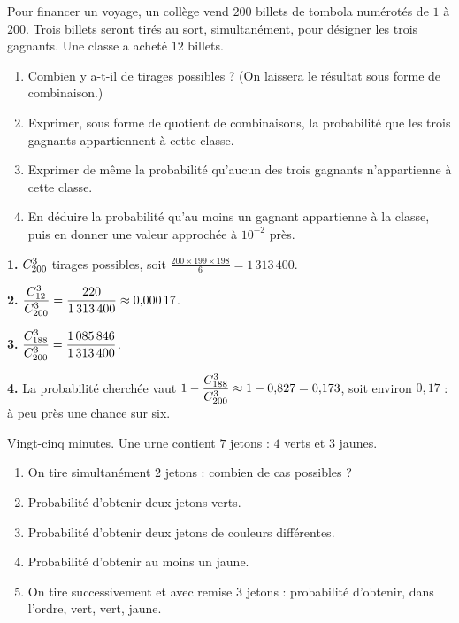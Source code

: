 \begin{situation}
Pour financer un voyage, un collège vend $200$ billets de tombola numérotés
de $1$ à $200$. Trois billets seront tirés au sort, simultanément, pour
désigner les trois gagnants. Une classe a acheté $12$ billets.

\begin{enumerate}[label=\textbf{\arabic*.}, leftmargin=*, itemsep=0.3em]
  \item Combien y a-t-il de tirages possibles ? (On laissera le résultat
        sous forme de combinaison.)
  \item Exprimer, sous forme de quotient de combinaisons, la probabilité que
        les trois gagnants appartiennent à cette classe.
  \item Exprimer de même la probabilité qu'aucun des trois gagnants
        n'appartienne à cette classe.
  \item En déduire la probabilité qu'au moins un gagnant appartienne à la
        classe, puis en donner une valeur approchée à $10^{-2}$ près.
\end{enumerate}
\end{situation}

\begin{corrige}
\textbf{1.} $\combi{3}{200}$ tirages possibles, soit
$\frac{200\times199\times198}{6} = 1\,313\,400$.

\textbf{2.} $\dfrac{\combi{3}{12}}{\combi{3}{200}}
= \dfrac{220}{1\,313\,400} \approx 0{,}000\,17$.

\textbf{3.} $\dfrac{\combi{3}{188}}{\combi{3}{200}}
= \dfrac{1\,085\,846}{1\,313\,400}$.

\textbf{4.} La probabilité cherchée vaut
$1-\dfrac{\combi{3}{188}}{\combi{3}{200}}
\approx 1-0{,}827 = 0{,}173$, soit environ $0{,}17$ : à peu près une chance
sur six.
\end{corrige}

\begin{jemeteste}
Vingt-cinq minutes. Une urne contient $7$ jetons : $4$ verts et $3$ jaunes.

\begin{enumerate}[label=\textbf{\arabic*.}, leftmargin=*, itemsep=0.3em]
  \item On tire simultanément $2$ jetons : combien de cas possibles ?
  \item Probabilité d'obtenir deux jetons verts.
  \item Probabilité d'obtenir deux jetons de couleurs différentes.
  \item Probabilité d'obtenir au moins un jaune.
  \item On tire successivement et avec remise $3$ jetons : probabilité
        d'obtenir, dans l'ordre, vert, vert, jaune.
\end{enumerate}
\end{jemeteste}

